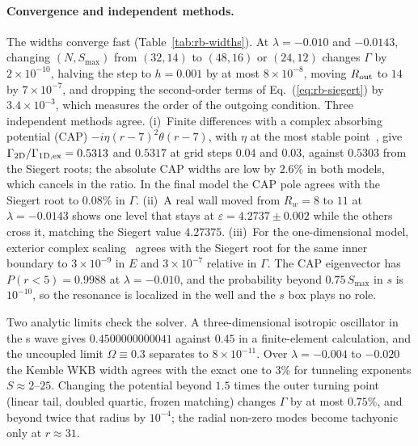 \paragraph{Convergence and independent methods.}
The widths converge fast (Table~\ref{tab:rb-widths}).
At $\lambda=-0.010$ and $-0.0143$, changing $(N,S_{\max})$ from $(32,14)$ to $(48,16)$ or $(24,12)$ changes $\Gamma$ by $2\times10^{-10}$, halving the step to $h=0.001$ by at most $8\times10^{-8}$, moving $R_{\rm out}$ to $14$ by $7\times10^{-7}$, and dropping the second-order terms of Eq.~(\ref{eq:rb-siegert}) by $3.4\times10^{-3}$, which measures the order of the outgoing condition. %
Three independent methods agree.
(i)~Finite differences with a complex absorbing potential (CAP) $-i\eta(r-7)^2\theta(r-7)$, with $\eta$ at the most stable point~\cite{Riss:1993cap}, give $\Gamma_{\rm 2D}/\Gamma_{\rm 1D,ex}=0.5313$ and $0.5317$ at grid steps $0.04$ and $0.03$, against $0.5303$ from the Siegert roots; the absolute CAP widths are low by $2.6\%$ in both models, which cancels in the ratio. %
In the final model the CAP pole agrees with the Siegert root to $0.08\%$ in $\Gamma$. %
(ii)~A real wall moved from $R_w=8$ to $11$ at $\lambda=-0.0143$ shows one level that stays at $\varepsilon=4.2737\pm0.002$ while the others cross it, matching the Siegert value $4.27375$. %
(iii)~For the one-dimensional model, exterior complex scaling~\cite{Simon:1979ecs} agrees with the Siegert root for the same inner boundary to $3\times10^{-9}$ in $E$ and $3\times10^{-7}$ relative in $\Gamma$. %
The CAP eigenvector has $P(r<5)=0.9988$ at $\lambda=-0.010$, and the probability beyond $0.75\,S_{\max}$ in $s$ is $10^{-10}$, so the resonance is localized in the well and the $s$ box plays no role. %

Two analytic limits check the solver.
A three-dimensional isotropic oscillator in the s wave gives $0.4500000000041$ against $0.45$ in a finite-element calculation, and the uncoupled limit $\Omega\equiv0.3$ separates to $8\times10^{-11}$. %
Over $\lambda=-0.004$ to $-0.020$ the Kemble WKB width agrees with the exact one to $3\%$ for tunneling exponents $S\approx2$--$25$. %
Changing the potential beyond $1.5$ times the outer turning point (linear tail, doubled quartic, frozen matching) changes $\Gamma$ by at most $0.75\%$, and beyond twice that radius by $10^{-4}$; the radial non-zero modes become tachyonic only at $r\approx31$. %


